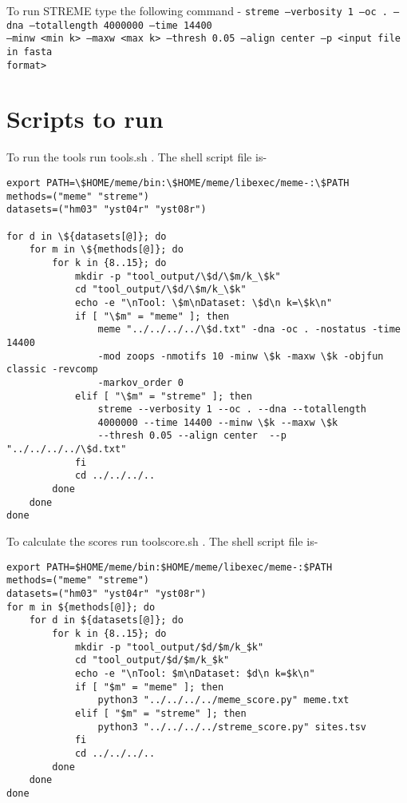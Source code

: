 \documentclass{report}
\begin{document}
    To run STREME type the following command - \newline
    \texttt{streme --verbosity 1 --oc . --dna --totallength 4000000 --time 14400 \\--minw <min k> --maxw <max k> --thresh 0.05 --align center  --p <input file in fasta \\format>} 
    
    \section{Scripts to run}
    To run the tools run tools.sh . The shell script file is-
    \begin{verbatim}
export PATH=\$HOME/meme/bin:\$HOME/meme/libexec/meme-:\$PATH
methods=("meme" "streme")
datasets=("hm03" "yst04r" "yst08r")

for d in \${datasets[@]}; do
    for m in \${methods[@]}; do
        for k in {8..15}; do
            mkdir -p "tool_output/\$d/\$m/k_\$k"
            cd "tool_output/\$d/\$m/k_\$k"
            echo -e "\nTool: \$m\nDataset: \$d\n k=\$k\n"
            if [ "\$m" = "meme" ]; then
                meme "../../../../\$d.txt" -dna -oc . -nostatus -time 14400
                -mod zoops -nmotifs 10 -minw \$k -maxw \$k -objfun classic -revcomp 
                -markov_order 0 
            elif [ "\$m" = "streme" ]; then
                streme --verbosity 1 --oc . --dna --totallength
                4000000 --time 14400 --minw \$k --maxw \$k 
                --thresh 0.05 --align center  --p "../../../../\$d.txt"
            fi
            cd ../../../..
        done
    done
done
\end{verbatim}

    To calculate the scores run toolscore.sh . The shell script file is-
    \begin{verbatim}
export PATH=$HOME/meme/bin:$HOME/meme/libexec/meme-:$PATH
methods=("meme" "streme")
datasets=("hm03" "yst04r" "yst08r")
for m in ${methods[@]}; do
    for d in ${datasets[@]}; do
        for k in {8..15}; do
            mkdir -p "tool_output/$d/$m/k_$k"
            cd "tool_output/$d/$m/k_$k"
            echo -e "\nTool: $m\nDataset: $d\n k=$k\n"
            if [ "$m" = "meme" ]; then
                python3 "../../../../meme_score.py" meme.txt
            elif [ "$m" = "streme" ]; then
                python3 "../../../../streme_score.py" sites.tsv
            fi
            cd ../../../..
        done
    done
done
\end{verbatim}
    
\end{document}

